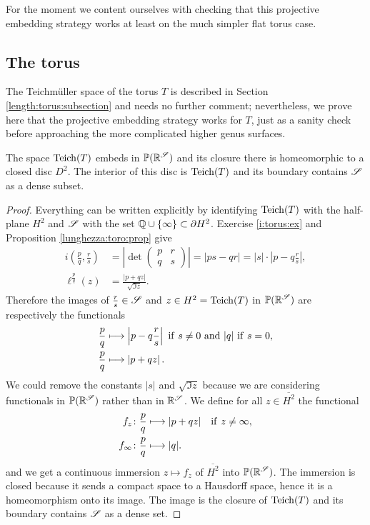 For the moment we content ourselves with checking that this projective embedding strategy works at least on the much simpler flat torus case.

\subsection{The torus}
The Teichm\"uller space of the torus $T$ is described in Section \ref{length:torus:subsection} and needs no further comment; nevertheless, we prove here that the projective embedding strategy works for $T$, just as a sanity check before approaching the more complicated higher genus surfaces.

\begin{prop} \label{T:compactification:prop}
The space ${\rm Teich}(T)$ embeds in $\mathbb{P}(\mathbb{R}^\mathscr{S})$ and its closure there is homeomorphic to a closed disc $D^2$. The interior of this disc is ${\rm Teich}(T)$ and its boundary contains $\mathscr{S}$ as a dense subset.
\end{prop}
\begin{proof}
Everything can be written explicitly by identifying ${\rm Teich}(T)$ with the half-plane $H^2$ and $\mathscr{S}$ with the set $\mathbb{Q}\cup \{\infty\} \subset \partial H^2$. Exercise \ref{i:torus:ex} and Proposition \ref{lunghezza:toro:prop} give
\begin{align*}
i\left(\frac pq, \frac rs \right) & = \left|\det \begin{pmatrix} p & r \\ q & s \end{pmatrix}\right| = |ps-qr| = |s|\cdot \left|p-q\frac rs \right|, \\ 
\ell^{\frac pq}(z) & = \frac {|p+qz|}{\sqrt{\Im z}}.
\end{align*}
Therefore the images of $\frac rs\in\mathscr{S}$ and $z\in H^2 = {\rm Teich}(T)$ in $\mathbb{P}(\mathbb{R}^\mathscr{S})$ are respectively the functionals
\begin{align*}
\frac pq & \longmapsto \left|p - q\frac rs\right| \ {\rm if\ } s \neq 0 {\rm \ and \ } |q|\ {\rm if } \ s=0, \\
\frac pq & \longmapsto \left|p+qz\right|.
\end{align*}
We could remove the constants $|s|$ and $\sqrt{\Im z}$ because we are considering functionals in $\mathbb{P}(\mathbb{R}^\mathscr{S})$ rather than in $\mathbb{R}^\mathscr{S}$. 
We define for all $z \in  \overline{H^2}$ the functional
\begin{align*}
f_z & \colon \frac pq \longmapsto |p+qz| \quad {\rm if\ } z\neq \infty,\\
f_\infty & \colon \frac pq \longmapsto |q|.
\end{align*}
and we get a continuous immersion $z \mapsto f_z$ of $\overline{H^2}$ into $\mathbb{P}(\mathbb{R}^\mathscr{S})$. The immersion is closed because it sends a compact space to a Hausdorff space, hence it is a homeomorphism onto its image. The image is the closure of ${\rm Teich}(T)$ and its boundary contains $\mathscr{S}$ as a dense set.
\end{proof}

